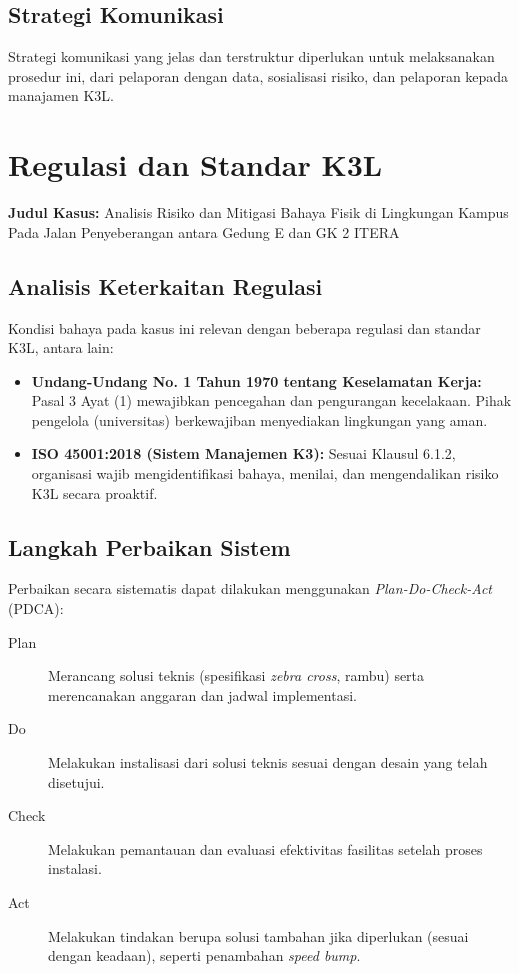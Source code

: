 \documentclass[a4paper, 12pt]{article}
\begin{document}
\subsection{Strategi Komunikasi}
Strategi komunikasi yang jelas dan terstruktur diperlukan untuk melaksanakan prosedur ini, dari pelaporan dengan data, sosialisasi risiko, dan pelaporan kepada manajamen K3L.
\section{Regulasi dan Standar K3L}
\noindent\textbf{Judul Kasus:}  Analisis Risiko dan Mitigasi Bahaya Fisik di Lingkungan Kampus Pada Jalan Penyeberangan antara Gedung E dan GK 2 ITERA 

\subsection{Analisis Keterkaitan Regulasi}
Kondisi bahaya pada kasus ini relevan dengan beberapa regulasi dan standar K3L, antara lain:
\begin{itemize}
    \item \textbf{Undang-Undang No. 1 Tahun 1970 tentang Keselamatan Kerja:} Pasal 3 Ayat (1) mewajibkan pencegahan dan pengurangan kecelakaan. Pihak pengelola (universitas) berkewajiban menyediakan lingkungan yang aman.
    \item \textbf{ISO 45001:2018 (Sistem Manajemen K3):} Sesuai Klausul 6.1.2, organisasi wajib mengidentifikasi bahaya, menilai, dan mengendalikan risiko K3L secara proaktif.
\end{itemize}

\subsection{Langkah Perbaikan Sistem}
Perbaikan secara sistematis dapat dilakukan menggunakan \textit{Plan-Do-Check-Act} (PDCA):
\begin{description}
    \item[Plan] Merancang solusi teknis (spesifikasi \textit{zebra cross}, rambu) serta merencanakan anggaran dan jadwal implementasi.
    \item[Do] Melakukan instalisasi dari solusi teknis sesuai dengan desain yang telah disetujui.
    \item[Check] Melakukan pemantauan dan evaluasi efektivitas fasilitas setelah proses instalasi.
    \item[Act] Melakukan tindakan berupa solusi tambahan jika diperlukan (sesuai dengan keadaan), seperti penambahan \textit{speed bump}.
\end{description}
\end{document}
